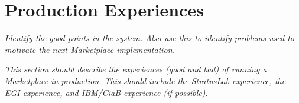 \section{Production Experiences}
\label{sec:production}

{\em Identify the good points in the system.  Also use this to
  identify problems used to motivate the next Marketplace
  implementation.}

{\em This section should describe the experiences (good and bad) of
  running a Marketplace in production.  This should include the
  StratusLab experience, the EGI experience, and IBM/CiaB experience
  (if possible).}
